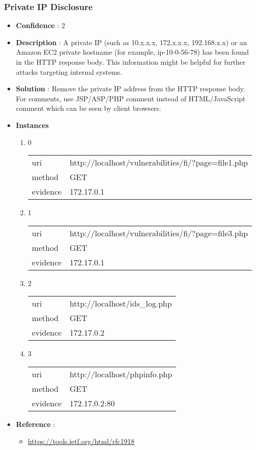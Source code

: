 \documentclass[10pt]{article}
\begin{document}
\subsubsection{Private IP Disclosure}
\begin{itemize}
\item[] \textbf{Confidence} : 2
\item[] \textbf{Description} : A private IP (such as 10.x.x.x, 172.x.x.x, 192.168.x.x) or an Amazon EC2 private hostname (for example, ip-10-0-56-78) has been found in the HTTP response body. This information might be helpful for further attacks targeting internal systems.
\item[] \textbf{Solution} :  Remove the private IP address from the HTTP response body.  For comments, use JSP/ASP/PHP comment instead of HTML/JavaScript comment which can be seen by client browsers.
\item[] \textbf{Instances}
\begin{enumerate}
\item[] 0
\begin{tabular}{| l | p{14cm}}
uri & http://localhost/vulnerabilities/fi/?page=file1.php \\
method & GET \\
evidence & 172.17.0.1 \\
\end{tabular}
\item[] 1
\begin{tabular}{| l | p{14cm}}
uri & http://localhost/vulnerabilities/fi/?page=file3.php \\
method & GET \\
evidence & 172.17.0.1 \\
\end{tabular}
\item[] 2
\begin{tabular}{| l | p{14cm}}
uri & http://localhost/ids{\_}log.php \\
method & GET \\
evidence & 172.17.0.2 \\
\end{tabular}
\item[] 3
\begin{tabular}{| l | p{14cm}}
uri & http://localhost/phpinfo.php \\
method & GET \\
evidence & 172.17.0.2:80 \\
\end{tabular}
\end{enumerate}
\item[] \textbf{Reference} : 
\begin{itemize}
\item \url{https://tools.ietf.org/html/rfc1918}
\end{itemize}
\end{itemize}
\end{document}
